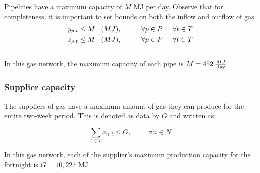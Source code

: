 \documentclass{article}
\begin{document}
Pipelines have a maximum capacity of \(M\) MJ per day. Observe that for completeness, it is important to set bounds on both the inflow and outflow of gas.\\
\begin{align}
    y_{p,t} &\leq M \hspace{0.3cm} (MJ), \hspace{1cm} \forall p \in P \hspace{0.51cm} \forall t \in T \\
    z_{p,t} &\leq M \hspace{0.3cm} (MJ), \hspace{1cm} \forall p \in P \hspace{0.51cm} \forall t \in T
\end{align}\\
In this gas network, the maximum capacity of each pipe is \(M = 452 \hspace{0.1cm} \frac{MJ}{\text{day}}\)

\bigskip
\subsubsection{Supplier capacity}
\bigskip

The suppliers of gas have a maximum amount of gas they can produce for the entire two-week period. This is denoted as data by \(G\) and written as:

\[\sum_{t\in T} x_{n,t} \leq G, \hspace{1cm} \forall n \in N\]

\noindent
In this gas network, each of the supplier's maximum production capacity for the fortnight is \(G = 10,227\) MJ
\end{document}
